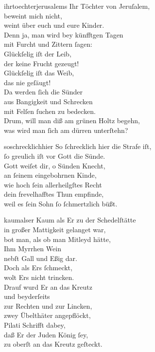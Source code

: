 \documentclass[tocstyle=ref-genre]{ees}
\begin{document}
{\begin{movement}{ihrtoechterjerusalems}
  Ihr Töchter von Jeruſalem,\\
  beweint mich nicht,\\
  weint über euch und eure Kinder.\\
  Denn ja, man wird bey künfftgen Tagen\\
  mit Furcht und Zittern ſagen:\\
  Glückſelig iſt der Leib,\\
  der keine Frucht gezeugt!\\
  Glückſelig iſt das Weib,\\
  das nie geſäugt!\\
  Da werden ſich die Sünder\\
  aus Bangigkeit und Schrecken\\
  mit Felſen ſuchen zu bedecken.\\
  Drum, will man diß am grünen Holtz begehn,\\
  was wird man ſich am dürren unterſtehn?
\end{movement}

\begin{movement}{soschrecklichhier}
  So ſchrecklich hier die Strafe iſt,\\
  ſo greulich iſt vor Gott die Sünde.\\
  Gott weiſet dir, o Sünden Knecht,\\
  an ſeinem eingebohrnen Kinde,\\
  wie hoch ſein allerheilgſtes Recht\\
  dein frevelhafftes Thun empfinde,\\
  weil es ſein Sohn ſo ſchmertzlich büßt.
\end{movement}

\begin{movement}{kaumalser}
  Kaum als Er zu der Schedelſtätte\\
  in großer Mattigkeit gelanget war,\\
  bot man, als ob man Mitleyd hätte,\\
  Ihm Myrrhen Wein\\
  nebſt Gall und Eßig dar.\\
  Doch als Ers ſchmeckt,\\
  wolt Ers nicht trincken.\\
  Drauf wurd Er an das Kreutz\\
  und beyderſeits\\
  zur Rechten und zur Lincken,\\
  zwey Übelthäter angepflöckt,\\
  Pilati Schrifft dabey,\\
  daß Er der Juden König ſey,\\
  zu oberſt an das Kreutz geſteckt.
\end{movement}

}
\end{document}
